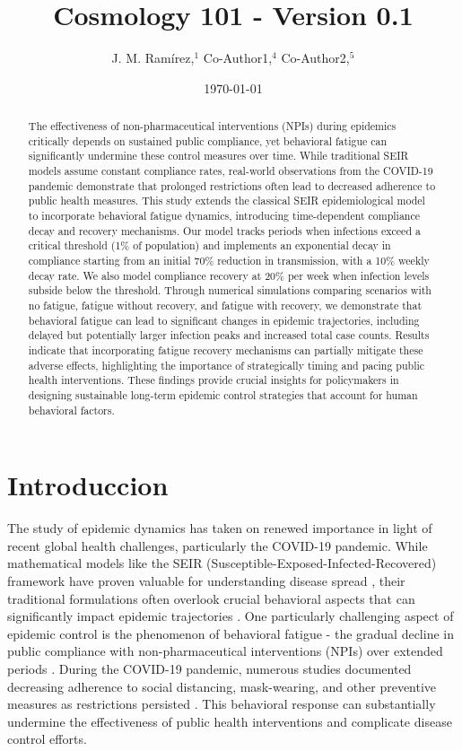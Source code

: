 \documentclass{article}\usepackage{graphicx} \usepackage{amsmath} \usepackage{colortbl}\title{Cosmology 101 - Version 0.1}
\author{J. M. Ram{\'i}rez,$^{1}$ Co-Author1,$^{4}$ Co-Author2,$^{5}$}
\date{\today}
\begin{document}
\maketitle\begin{abstract} 
The effectiveness of non-pharmaceutical interventions (NPIs) during epidemics critically depends on sustained public compliance, yet behavioral fatigue can significantly undermine these control measures over time. While traditional SEIR models assume constant compliance rates, real-world observations from the COVID-19 pandemic demonstrate that prolonged restrictions often lead to decreased adherence to public health measures.
This study extends the classical SEIR epidemiological model to incorporate behavioral fatigue dynamics, introducing time-dependent compliance decay and recovery mechanisms. Our model tracks periods when infections exceed a critical threshold (1\% of population) and implements an exponential decay in compliance starting from an initial 70\% reduction in transmission, with a 10\% weekly decay rate. We also model compliance recovery at 20\% per week when infection levels subside below the threshold. 
Through numerical simulations comparing scenarios with no fatigue, fatigue without recovery, and fatigue with recovery, we demonstrate that behavioral fatigue can lead to significant changes in epidemic trajectories, including delayed but potentially larger infection peaks and increased total case counts. Results indicate that incorporating fatigue recovery mechanisms can partially mitigate these adverse effects, highlighting the importance of strategically timing and pacing public health interventions. These findings provide crucial insights for policymakers in designing sustainable long-term epidemic control strategies that account for human behavioral factors.
\end{abstract}\section{Introduccion}
The study of epidemic dynamics has taken on renewed importance in light of recent global health challenges, particularly the COVID-19 pandemic. While mathematical models like the SEIR (Susceptible-Exposed-Infected-Recovered) framework have proven valuable for understanding disease spread \cite{kermack1927contribution}, their traditional formulations often overlook crucial behavioral aspects that can significantly impact epidemic trajectories \cite{funk2010modelling}.
One particularly challenging aspect of epidemic control is the phenomenon of behavioral fatigue - the gradual decline in public compliance with non-pharmaceutical interventions (NPIs) over extended periods \cite{harvey2020covid}. During the COVID-19 pandemic, numerous studies documented decreasing adherence to social distancing, mask-wearing, and other preventive measures as restrictions persisted \cite{petherick2021worldwide}. This behavioral response can substantially undermine the effectiveness of public health interventions and complicate disease control efforts.
\end{document}
